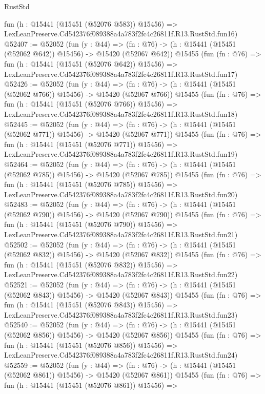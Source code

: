 \begin{lexlean}{RustStd}
\begin{coremodule}
    fun (h : @15441 (@15451 (@52076 @583)) @15456) =>
    LexLeanPreserve.Cd542376f089388a4a783f2fc4c26811f.R13.RustStd.fun16)
@52407 := @52052
    (fun (y : @44) =>
    (fn : @76) -> (h : @15441 (@15451 (@52062 @642)) @15456) -> @15420 (@52067 @642))
    @15455
    (fun (fn : @76) =>
    fun (h : @15441 (@15451 (@52076 @642)) @15456) =>
    LexLeanPreserve.Cd542376f089388a4a783f2fc4c26811f.R13.RustStd.fun17)
@52426 := @52052
    (fun (y : @44) =>
    (fn : @76) -> (h : @15441 (@15451 (@52062 @766)) @15456) -> @15420 (@52067 @766))
    @15455
    (fun (fn : @76) =>
    fun (h : @15441 (@15451 (@52076 @766)) @15456) =>
    LexLeanPreserve.Cd542376f089388a4a783f2fc4c26811f.R13.RustStd.fun18)
@52445 := @52052
    (fun (y : @44) =>
    (fn : @76) -> (h : @15441 (@15451 (@52062 @771)) @15456) -> @15420 (@52067 @771))
    @15455
    (fun (fn : @76) =>
    fun (h : @15441 (@15451 (@52076 @771)) @15456) =>
    LexLeanPreserve.Cd542376f089388a4a783f2fc4c26811f.R13.RustStd.fun19)
@52464 := @52052
    (fun (y : @44) =>
    (fn : @76) -> (h : @15441 (@15451 (@52062 @785)) @15456) -> @15420 (@52067 @785))
    @15455
    (fun (fn : @76) =>
    fun (h : @15441 (@15451 (@52076 @785)) @15456) =>
    LexLeanPreserve.Cd542376f089388a4a783f2fc4c26811f.R13.RustStd.fun20)
@52483 := @52052
    (fun (y : @44) =>
    (fn : @76) -> (h : @15441 (@15451 (@52062 @790)) @15456) -> @15420 (@52067 @790))
    @15455
    (fun (fn : @76) =>
    fun (h : @15441 (@15451 (@52076 @790)) @15456) =>
    LexLeanPreserve.Cd542376f089388a4a783f2fc4c26811f.R13.RustStd.fun21)
@52502 := @52052
    (fun (y : @44) =>
    (fn : @76) -> (h : @15441 (@15451 (@52062 @832)) @15456) -> @15420 (@52067 @832))
    @15455
    (fun (fn : @76) =>
    fun (h : @15441 (@15451 (@52076 @832)) @15456) =>
    LexLeanPreserve.Cd542376f089388a4a783f2fc4c26811f.R13.RustStd.fun22)
@52521 := @52052
    (fun (y : @44) =>
    (fn : @76) -> (h : @15441 (@15451 (@52062 @843)) @15456) -> @15420 (@52067 @843))
    @15455
    (fun (fn : @76) =>
    fun (h : @15441 (@15451 (@52076 @843)) @15456) =>
    LexLeanPreserve.Cd542376f089388a4a783f2fc4c26811f.R13.RustStd.fun23)
@52540 := @52052
    (fun (y : @44) =>
    (fn : @76) -> (h : @15441 (@15451 (@52062 @856)) @15456) -> @15420 (@52067 @856))
    @15455
    (fun (fn : @76) =>
    fun (h : @15441 (@15451 (@52076 @856)) @15456) =>
    LexLeanPreserve.Cd542376f089388a4a783f2fc4c26811f.R13.RustStd.fun24)
@52559 := @52052
    (fun (y : @44) =>
    (fn : @76) -> (h : @15441 (@15451 (@52062 @861)) @15456) -> @15420 (@52067 @861))
    @15455
    (fun (fn : @76) =>
    fun (h : @15441 (@15451 (@52076 @861)) @15456) =>

\end{coremodule}
\end{lexlean}

